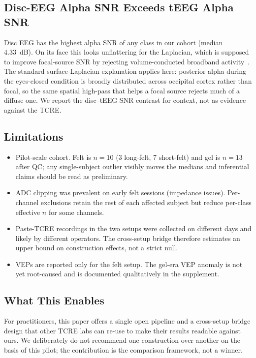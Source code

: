 \documentclass[10pt,a4paper]{article}
\begin{document}
\subsection{Disc-EEG Alpha SNR Exceeds tEEG Alpha SNR}
Disc EEG has the highest alpha SNR of any class in our cohort (median 4.33~dB). On its face this looks unflattering for the Laplacian, which is supposed to improve focal-source SNR by rejecting volume-conducted broadband activity~\cite{besio2006,koka2007}. The standard surface-Laplacian explanation applies here: posterior alpha during the eyes-closed condition is broadly distributed across occipital cortex rather than focal, so the same spatial high-pass that helps a focal source rejects much of a diffuse one. We report the disc--tEEG SNR contrast for context, not as evidence against the TCRE.

\subsection{Limitations}

\begin{itemize}
\item Pilot-scale cohort. Felt is $n=10$ (3 long-felt, 7 short-felt) and gel is $n=13$ after QC; any single-subject outlier visibly moves the medians and inferential claims should be read as preliminary.
\item ADC clipping was prevalent on early felt sessions (impedance issues). Per-channel exclusions retain the rest of each affected subject but reduce per-class effective $n$ for some channels.
\item Paste-TCRE recordings in the two setups were collected on different days and likely by different operators. The cross-setup bridge therefore estimates an upper bound on construction effects, not a strict null.
\item VEPs are reported only for the felt setup. The gel-era VEP anomaly is not yet root-caused and is documented qualitatively in the supplement.
\end{itemize}

\subsection{What This Enables}
For practitioners, this paper offers a single open pipeline and a cross-setup bridge design that other TCRE labs can re-use to make their results readable against ours. We deliberately do not recommend one construction over another on the basis of this pilot; the contribution is the comparison framework, not a winner.
\end{document}
